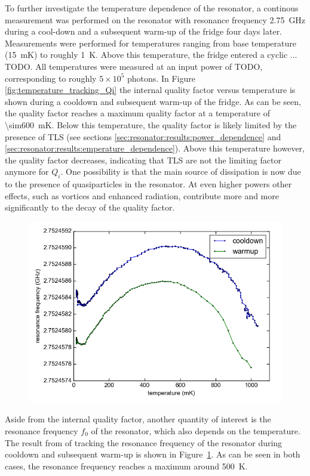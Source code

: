 \documentclass[12pt]{report}
\begin{document}
To further investigate the temperature dependence of the resonator, a continous measurement was performed on the resonator with resonance frequency \SI{2.75}{\giga \hertz} during a cool-down and a subsequent warm-up of the fridge four days later. Measurements were performed for temperatures ranging from base temperature (\SI{15}{\milli \kelvin}) to roughly \SI{1}{\kelvin}. Above this temperature, the fridge entered a cyclic ... TODO. All temperatures were measured at an input power of TODO, corresponding to roughly $5 \times 10^5$ photons. In Figure \ref{fig:temperature_tracking_Qi} the internal quality factor versus temperature is shown during a cooldown and subsequent warm-up of the fridge. As can be seen, the quality factor reaches a maximum quality factor at a temperature of \SI{\sim600}{\milli \kelvin}. Below this temperature, the quality factor is likely limited by the presence of TLS (see sections \ref{sec:resonator:results:power_dependence} and \ref{sec:resonator:results:emperature_dependence}). Above this temperature however, the quality factor decreases, indicating that TLS are not the limiting factor anymore for $Q_i$. One possibility is that the main source of dissipation is now due to the presence of quasiparticles in the resonator. At even higher powers other effects, such as vortices and enhanced radiation, contribute more and more significantly to the decay of the quality factor.


\begin{figure}[h]
    \centering
    \includegraphics[width=.7\textwidth]{Figures/Temperature tracking - f0 vs T.png}
    \label{fig:temperature_tracking_f0}
\end{figure}


Aside from the internal quality factor, another quantity of interest is the resonance frequency $f_0$ of the resonator, which also depends on the temperature. The result from of tracking the resonance frequency of the resonator during cooldown and subsequent warm-up is shown in Figure~\ref{fig:temperature_tracking_f0}. As can be seen in both cases, the resonance frequency reaches a maximum around \SI{500}{\kelvin}.
\end{document}
